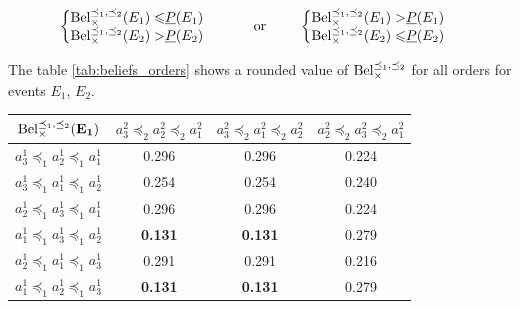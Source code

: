 \begin{example}
 \begin{align*}
    \begin{cases}
        \begin{split}
            {\mathrm{Bel}}_\times^{\preceq_1,\preceq_2}(E_1) \leqslant& {\underline{P}}(E_1)\\
            {\mathrm{Bel}}_\times^{\preceq_1,\preceq_2}(E_2) >& {\underline{P}}(E_2)
        \end{split}
    \end{cases}
    \qquad\text{ or }\qquad
    \begin{cases}
        \begin{split}
            {\mathrm{Bel}}_\times^{\preceq_1,\preceq_2}(E_1) >& {\underline{P}}(E_1)\\
            {\mathrm{Bel}}_\times^{\preceq_1,\preceq_2}(E_2) \leqslant& {\underline{P}}(E_2)
        \end{split}
    \end{cases}
\end{align*}

The table \ref{tab:beliefs_orders} shows a rounded value of ${\mathrm{Bel}}^{\preceq_1,\preceq_2}_\times$ for all orders for events $E_1$, $E_2$.

\begin{center}
\begin{tabular}{|c||c|c|c|}
\hline
${\mathrm{Bel}}^{\preceq_1,\preceq_2}_\times(\mathbf{E_1})$ & $a^2_3\preceq_2a^2_2\preceq_2a^2_1$ & $a^2_3\preceq_2a^2_1\preceq_2a^2_2$ & $a^2_2\preceq_2a^2_3\preceq_2a^2_1$ \\ \hline\hline
$a^1_3\preceq_1a^1_2\preceq_1a^1_1$ & 0.296 & 0.296 & 0.224 \\ \hline
$a^1_3\preceq_1a^1_1\preceq_1a^1_2$ & 0.254 & 0.254 & 0.240 \\ \hline
$a^1_2\preceq_1a^1_3\preceq_1a^1_1$ & 0.296 & 0.296 & 0.224 \\ \hline
$a^1_1\preceq_1a^1_3\preceq_1a^1_2$ & \textbf{0.131} & \textbf{0.131} & 0.279 \\ \hline
$a^1_2\preceq_1a^1_1\preceq_1a^1_3$ & 0.291 & 0.291 & 0.216 \\ \hline
$a^1_1\preceq_1a^1_2\preceq_1a^1_3$ & \textbf{0.131} & \textbf{0.131} & 0.279 \\ \hline
\end{tabular}

\vspace{0.5cm}


\end{center}
\end{example}
